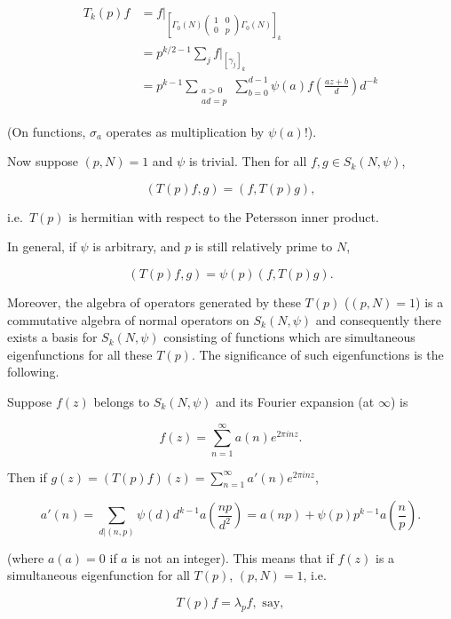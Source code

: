\[
\begin{aligned}
T_k(p)f &= f\big|_{\left[\Gamma_0(N)\begin{pmatrix} 1 & 0 \\ 0 & p \end{pmatrix}\Gamma_0(N)\right]_k}\\
&= p^{k/2 - 1}\sum_j f\big|_{[\gamma_j]_k}\\
&= p^{k - 1}\sum_{\substack{a > 0\\ ad = p}}\sum_{b=0}^{d-1} \psi(a) f\!\left(\frac{az + b}{d}\right) d^{-k}
\end{aligned}
\]

(On functions, $\sigma_a$ operates as multiplication by $\psi(a)$!).

Now suppose $(p,N) = 1$ and $\psi$ is trivial. Then for all $f, g \in S_k(N,\psi)$,

\begin{equation}\label{eq:1.19}
(T(p)f, g) = (f, T(p)g),\tag{1.19}
\end{equation}

i.e.\ $T(p)$ is hermitian with respect to the Petersson inner product.

In general, if $\psi$ is arbitrary, and $p$ is still relatively prime to $N$,

\[
(T(p)f, g) = \psi(p)(f, T(p)g).
\]

Moreover, the algebra of operators generated by these $T(p)$ ($(p,N) = 1$) is a commutative algebra of normal operators on $S_k(N,\psi)$ and consequently there exists a basis for $S_k(N,\psi)$ consisting of functions which are simultaneous eigenfunctions for all these $T(p)$. The significance of such eigenfunctions is the following.

Suppose $f(z)$ belongs to $S_k(N,\psi)$ and its Fourier expansion (at $\infty$) is

\[
f(z) = \sum_{n=1}^{\infty} a(n) e^{2\pi inz}.
\]

Then if $g(z) = (T(p)f)(z) = \sum_{n=1}^{\infty} a'(n) e^{2\pi inz}$,

\begin{equation}\label{eq:1.20}
a'(n) = \sum_{d|(n,p)} \psi(d) d^{k-1} a\!\left(\frac{np}{d^2}\right) = a(np) + \psi(p) p^{k-1} a\!\left(\frac{n}{p}\right).\tag{1.20}
\end{equation}

(where $a(a) = 0$ if $a$ is not an integer). This means that if $f(z)$ is a simultaneous eigenfunction for all $T(p)$, $(p,N) = 1$, i.e.

\[
T(p)f = \lambda_p f, \text{ say},
\]

